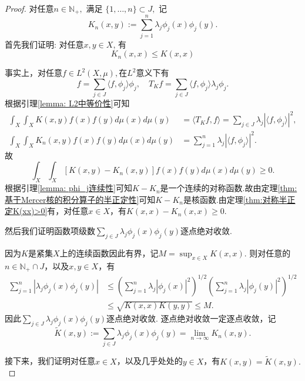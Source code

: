 \documentclass[../master.tex]{subfiles}
\begin{document}
\begin{proof}
     对任意$n\in\mathbb N_+,$ 满足 $\{1,\dots,n\} \subset J,$ 记
$$K_{n}(x,y) := \sum_{j=1}^{n} \lambda_{j} \phi_{j}(x) \phi_{j}(y).$$
首先我们证明: 对任意$ x,y \in X$, 有
$$
K_{n}(x,x) \leq K(x,x)
$$

事实上，对任意$f\in L^2(X,\mu),$在$L^2$意义下有
\begin{equation*}
    f=\sum_{j\in J}\langle f,\phi_j\rangle\phi_j,\quad T_Kf=\sum_{j\in J}\langle f,\phi_j\rangle\lambda_j\phi_j.
\end{equation*}
根据引理\ref{lemma: L2中等价性}可知
\begin{align*}
    \int_{X}\int_{X}K(x,y)f(x)f(y)d\mu(x)d\mu(y) & =\langle T_{K}f,f\rangle=\sum_{j\in J}\lambda_{j}|\langle f,\phi_{j}\rangle|^{2}, \\
\int_{X}\int_{X}K_{n}(x,y)f(x)f(y)d\mu(x)d\mu(y) & =\sum_{j=1}^n\lambda_j|\langle f,\phi_j\rangle|^2.
\end{align*}
故
\begin{equation*}
    \int_X\int_X[K(x,y)-K_n(x,y)]f(x)f(y)d\mu(x)d\mu(y)\geq0.
\end{equation*}
根据引理\eqref{lemma: phi_j连续性}可知$K-K_n$是一个连续的对称函数.故由定理\ref{thm:基于Mercer核的积分算子的半正定性}可知$K-K_n$是核函数.由定理\ref{thm:对称半正定K(xx)>0}有，对任意$x\in X$，有$K(x,x)-K_n(x,x)\geq 0$.


然后我们证明函数项级数$\sum_{j\in J} \lambda_j \phi_j(x)\phi_j(y)$逐点绝对收敛. 

因为$K$是紧集$X$上的连续函数因此有界，记$M = \sup_{x\in X} K(x,x)$. 则对任意的$n\in \mathbb{N}_+\cap J$，以及$x,y\in X$，有
\begin{align}\label{eq:K_n的有界性}
    \sum_{j=1}^n |\lambda_j\phi_j(x)\phi_j(y)|&\leq \left(\sum_{j=1}^n\lambda_j|\phi_j(x)|^2\right)^{1/2}\left(\sum_{j=1}^n\lambda_j|\phi_j(y)|^2\right)^{1/2} \nonumber\\
    &\leq \sqrt{K(x,x)K(y,y)}\leq M .
\end{align}
因此$\sum_{j\in J} \lambda_j \phi_j(x)\phi_j(y)$逐点绝对收敛.
逐点绝对收敛一定逐点收敛，记
$$\widetilde{K}(x,y):=\sum_{j\in J}\lambda_j\phi_j(x)\phi_j(y)=\lim_{n\to\infty}K_n(x,y).$$

接下来，我们证明对任意$x\in X$，以及几乎处处的$y\in X$，有$K(x,y)= \widetilde{K}(x,y).$


\end{proof}
\end{document}
